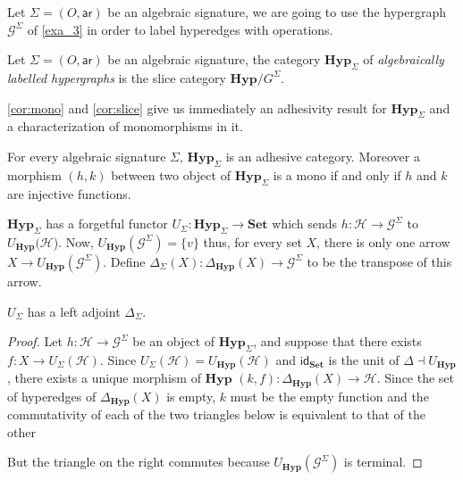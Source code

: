 \documentclass[a4paper,UKenglish,cleveref,pdftex,thm-restate,numberwithinsect]{lipics-v2021}
\newcommand{\cat}[1]{\ensuremath{\mathbf{#1}}}
\newcommand{\id}[1]{\mathsf{id}_{#1}}
\newcommand{\hyp}{\cat{Hyp}}
\newcommand{\hyps}{\cat{Hyp}_{\Sigma}}
\newcommand{\ari}[0]{\mathsf{ar}}
\begin{document}
Let $\Sigma=(O, \ari)$ be an algebraic signature, we are going to use the hypergraph $\mathcal{G}^{\Sigma}$ of \ref{exa_3} in order to label hyperedges with operations.
\begin{definition}Let $\Sigma=(O, \ari)$ be an algebraic signature, the category $\hyps$ of \emph{algebraically labelled hypergraphs} is the slice category $\hyp/G^\Sigma$.
\end{definition}
\cref{cor:mono} and \cref{cor:slice} give us immediately an adhesivity result for $\hyp_{\Sigma}$ and a characterization of monomorphisms in it.
\begin{proposition}\label{prop:mono}
	For every algebraic signature $\Sigma$, $\hyps$ is an adhesive category. Moreover a morphism $(h,k)$ between two object of $\hyp_{\Sigma}$ is a mono if and only if $h$ and $k$ are injective functions.
\end{proposition}

$\hyp_{\Sigma}$ has a forgetful functor $U_{\Sigma}:\hyp_{\Sigma}\to \cat{Set}$ which sends $h:\mathcal{H}\to \mathcal{G}^{\Sigma}$ to $U_{\hyp}(\mathcal{H}$). Now, $U_{\hyp}(\mathcal{G}^{\Sigma})=\{v\}$ thus, for every set $X$, there is only one arrow $X\to U_{\hyp}(\mathcal{G}^{\Sigma})$. Define $\Delta_{\Sigma}(X):\Delta_{\hyp}(X)\to \mathcal{G}^{\Sigma}$ to be the transpose of this arrow.

\begin{proposition} $U_\Sigma$
	has a left adjoint $\Delta_\Sigma$.
\end{proposition}
\begin{proof}Let $h:\mathcal{H}\to \mathcal{G}^{\Sigma}$ be an object of $\hyp_{\Sigma}$, and suppose that there exists $f:X\to U_{\Sigma}(\mathcal{H})$. Since $U_{\Sigma}(\mathcal{H})=U_{\hyp}(\mathcal{H})$ and $\id{\cat{Set}}$ is the unit of $\Delta\dashv U_{\hyp}$, there exists a unique morphism of $\hyp$ $(k,f):\Delta_{\hyp}(X)\to \mathcal{H}$. Since the set of hyperedges of $\Delta_{\hyp}(X)$ is empty, $k$ must be the empty function and the commutativity of each of the two triangles below is equivalent to that of the other
	\begin{center}
	\end{center}
	But the triangle on the right commutes because $U_{\hyp}(\mathcal{G}^{\Sigma})$ is terminal.
\end{proof}
\end{document}
